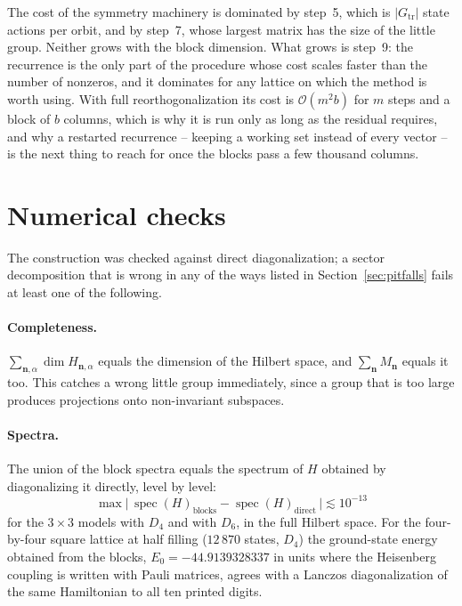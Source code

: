\documentclass[12pt]{article}
\newcommand{\Gtr}{G_{\mathrm{tr}}}
\begin{document}
The cost of the symmetry machinery is dominated by step~5, which is
$|\Gtr|$ state actions per orbit, and by step~7, whose largest matrix has the size
of the little group. Neither grows with the block dimension. What grows is
step~9: the recurrence is the only part of the procedure whose cost scales
faster than the number of nonzeros, and it dominates for any lattice on which the
method is worth using. With full reorthogonalization its cost is
$\mathcal{O}(m^{2}b)$ for $m$ steps and a block of $b$ columns, which is why it is
run only as long as the residual requires, and why a restarted recurrence --
keeping a working set instead of every vector -- is the
next thing to reach for once the blocks pass a few thousand columns.

\section{Numerical checks}\label{sec:checks}

The construction was checked against direct diagonalization; a sector
decomposition that is wrong in any of the ways listed in
Section~\ref{sec:pitfalls} fails at least one of the following.

\paragraph{Completeness.} $\sum_{\mathbf{n},\alpha}\dim H_{\mathbf{n},\alpha}$
equals the dimension of the Hilbert space, and $\sum_{\mathbf{n}}M_{\mathbf{n}}$
equals it too. This catches a wrong little group immediately, since a group that
is too large produces projections onto non-invariant subspaces.

\paragraph{Spectra.} The union of the block spectra equals the spectrum of $H$
obtained by diagonalizing it directly, level by level:
\begin{equation}
  \max\bigl|\,\operatorname{spec}(H)_{\text{blocks}} -
  \operatorname{spec}(H)_{\text{direct}}\,\bigr| \lesssim 10^{-13}
\end{equation}
for the $3\times3$ models with $D_4$ and with $D_6$, in the full Hilbert space.
For the four-by-four square lattice at half filling ($12\,870$ states, $D_4$) the
ground-state energy obtained from the blocks,
$E_0 = -44.9139328337$ in units where the Heisenberg coupling is written with
Pauli matrices, agrees with a Lanczos diagonalization of the same Hamiltonian to
all ten printed digits.
\end{document}
